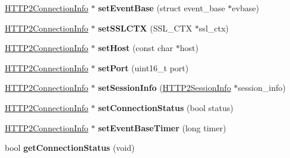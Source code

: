 \begin{DoxyCompactItemize}
\item 
\mbox{\label{classhttp2_1_1HTTP2ConnectionInfo_a283a15ab9f406b260535eeb0ed39b811}} 
\hyperlink{classhttp2_1_1HTTP2ConnectionInfo}{H\+T\+T\+P2\+Connection\+Info} $\ast$ {\bfseries set\+Event\+Base} (struct event\+\_\+base $\ast$evbase)
\item 
\mbox{\label{classhttp2_1_1HTTP2ConnectionInfo_aa79220a80575ba3c205b436bdf21345c}} 
\hyperlink{classhttp2_1_1HTTP2ConnectionInfo}{H\+T\+T\+P2\+Connection\+Info} $\ast$ {\bfseries set\+S\+S\+L\+C\+TX} (S\+S\+L\+\_\+\+C\+TX $\ast$ssl\+\_\+ctx)
\item 
\mbox{\label{classhttp2_1_1HTTP2ConnectionInfo_aa2cd85e5b1f0d9cb1163955f1cb027d6}} 
\hyperlink{classhttp2_1_1HTTP2ConnectionInfo}{H\+T\+T\+P2\+Connection\+Info} $\ast$ {\bfseries set\+Host} (const char $\ast$host)
\item 
\mbox{\label{classhttp2_1_1HTTP2ConnectionInfo_a34c8173e5708c220fa9d19f4c1912d3a}} 
\hyperlink{classhttp2_1_1HTTP2ConnectionInfo}{H\+T\+T\+P2\+Connection\+Info} $\ast$ {\bfseries set\+Port} (uint16\+\_\+t port)
\item 
\mbox{\label{classhttp2_1_1HTTP2ConnectionInfo_a46fc3476753d9dce9a69a307c25e1295}} 
\hyperlink{classhttp2_1_1HTTP2ConnectionInfo}{H\+T\+T\+P2\+Connection\+Info} $\ast$ {\bfseries set\+Session\+Info} (\hyperlink{classhttp2_1_1HTTP2SessionInfo}{H\+T\+T\+P2\+Session\+Info} $\ast$session\+\_\+info)
\item 
\mbox{\label{classhttp2_1_1HTTP2ConnectionInfo_a4389fcd49670337eff27f19ea79ea0a2}} 
\hyperlink{classhttp2_1_1HTTP2ConnectionInfo}{H\+T\+T\+P2\+Connection\+Info} $\ast$ {\bfseries set\+Connection\+Status} (bool status)
\item 
\mbox{\label{classhttp2_1_1HTTP2ConnectionInfo_add0ae1379c1806eca65f8a8182ee8675}} 
\hyperlink{classhttp2_1_1HTTP2ConnectionInfo}{H\+T\+T\+P2\+Connection\+Info} $\ast$ {\bfseries set\+Event\+Base\+Timer} (long timer)
\item 
\mbox{\label{classhttp2_1_1HTTP2ConnectionInfo_a581ffd24ae136175ef0270dddaa6bb32}} 
bool {\bfseries get\+Connection\+Status} (void)
\end{DoxyCompactItemize}
